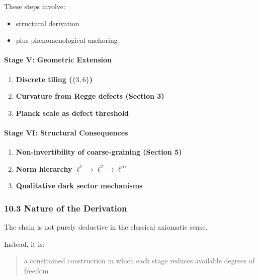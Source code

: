 \documentclass[
]{article}
\providecommand{\tightlist}{%
  \setlength{\itemsep}{0pt}\setlength{\parskip}{0pt}}
\begin{document}
These steps involve:

\begin{itemize}
\tightlist
\item
  structural derivation
\item
  plus phenomenological anchoring
\end{itemize}

\hypertarget{stage-v-geometric-extension}{%
\paragraph{Stage V: Geometric
Extension}\label{stage-v-geometric-extension}}

\begin{enumerate}
\def\labelenumi{\arabic{enumi}.}
\setcounter{enumi}{13}
\tightlist
\item
  \textbf{Discrete tiling (\(\{3,6\}\))}
\item
  \textbf{Curvature from Regge defects (Section 3)}
\item
  \textbf{Planck scale as defect threshold}
\end{enumerate}

\hypertarget{stage-vi-structural-consequences}{%
\paragraph{Stage VI: Structural
Consequences}\label{stage-vi-structural-consequences}}

\begin{enumerate}
\def\labelenumi{\arabic{enumi}.}
\setcounter{enumi}{16}
\tightlist
\item
  \textbf{Non-invertibility of coarse-graining (Section 5)}
\item
  \textbf{Norm hierarchy \(\ell^1 \to \ell^2 \to \ell^\infty\)}
\item
  \textbf{Qualitative dark sector mechanisms}
\end{enumerate}

\hypertarget{nature-of-the-derivation}{%
\subsubsection{10.3 Nature of the
Derivation}\label{nature-of-the-derivation}}

The chain is not purely deductive in the classical axiomatic sense.

Instead, it is:

\begin{quote}
a constrained construction in which each stage reduces available degrees
of freedom
\end{quote}
\end{document}
